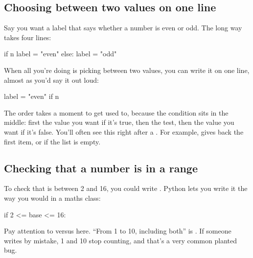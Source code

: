 \documentclass[10pt,a4paper]{article}
\begin{document}
\subsection{Choosing between two values on one line}
Say you want a label that says whether a number is even or odd. The long way takes four lines:
\begin{pycode}
if n %
    label = "even"
else:
    label = "odd"
\end{pycode}
When all you’re doing is picking between two values, you can write it on one line, almost as you’d say it out loud:
\begin{pycode}
label = "even" if n %
\end{pycode}
The order takes a moment to get used to, because the condition sits in the middle: first the value you want if it’s true, then the test, then the value you want if it’s false. You’ll often see this right after a . For example,  gives back the first item, or  if the list is empty.
\subsection{Checking that a number is in a range}
To check that  is between 2 and 16, you could write . Python lets you write it the way you would in a maths class:
\begin{pycode}
if 2 <= base <= 16:
\end{pycode}
Pay attention to \code{\textless{}\allowbreak{}} versus \code{\textless{}\allowbreak{}=\allowbreak{}} here. “From 1 to 10, including both” is . If someone writes \code{\textless{}\allowbreak{}} by mistake, 1 and 10 stop counting, and that’s a very common planted bug.
\end{document}
